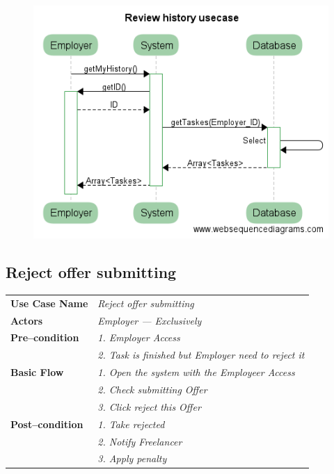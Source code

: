 \documentclass{article}
\begin{document}
\begin{figure}[ht!]
\centering
\includegraphics[width=128mm]{Review_history_usecase.png}
\end{figure}


\newpage
\subsection{Reject offer submitting }
    \begin{tabular}{ l | l }
    \toprule
      \rowcolor{LightCyan}
      \textbf{Use Case Name}    & \textit{Reject offer submitting}\\
      \textbf{Actors}           & \textit{Employer --- Exclusively}\\
      \rowcolor{LightCyan}
      \textbf{Pre--condition}   & \textit{1. Employer Access}\\
	    			& \textit{2. Task is finished but Employer need to reject it}\\
      \textbf{Basic Flow}       & \textit{1. Open the system with the Employeer Access}\\
                                & \textit{2. Check submitting Offer}\\
                                & \textit{3. Click reject this Offer}\\
      \rowcolor{LightCyan}
      \textbf{Post--condition}  & \textit{1. Take rejected}\\
	    			& \textit{2. Notify Freelancer}\\
				& \textit{3. Apply penalty}\\
    \toprule
    \end{tabular}
\end{document}
